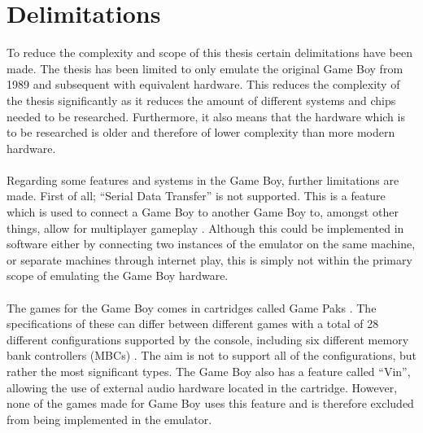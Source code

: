 \section{Delimitations}
\label{sec:Delimitations}
To reduce the complexity and scope of this thesis certain delimitations have been made.
The thesis has been limited to only emulate the original Game Boy from 1989 and subsequent with equivalent hardware. This reduces the complexity of the thesis significantly as it reduces the amount of different systems and chips needed to be researched. Furthermore, it also means that the hardware which is to be researched is older and therefore of lower complexity than more modern hardware.
\\\\
Regarding some features and systems in the Game Boy, further limitations are made. First of all; ``Serial Data Transfer'' is not supported. This is a feature which is used to connect a Game Boy to another Game Boy to, amongst other things, allow for multiplayer gameplay \cite{GBWikiSerialDataTransferTutorial}. Although this could be implemented in software either by connecting two instances of the emulator on the same machine, or separate machines through internet play, this is simply not within the primary scope of emulating the Game Boy hardware. %
\\\\
The games for the Game Boy comes in cartridges called Game Paks \cite{gamepak}. The specifications of these can differ between different games with a total of 28 different configurations supported by the console, including six different memory bank controllers (MBCs) \cite{cartridgeType}. The aim is not to support all of the configurations, but rather the most significant types. 
\newpage
The Game Boy also has a feature called ``Vin'', allowing the use of external audio hardware located in the cartridge. However, none of the games made for Game Boy uses this feature \cite{pandDocsSoundControlRegisters} and is therefore excluded from being implemented in the emulator.

